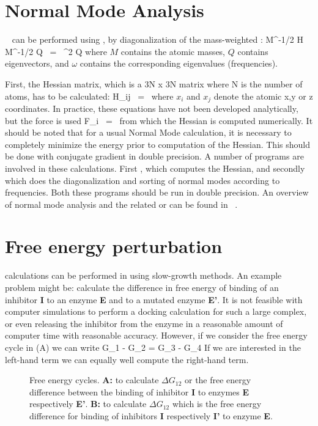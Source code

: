 \section{Normal Mode Analysis}
~\cite{Levitt83,Go83,BBrooks83b} 
can be performed using {\gromacs}, by diagonalization of the mass-weighted
:
\beq
M^{-1/2} H M^{-1/2} Q   ~=~     \omega^2 Q
\eeq
where $M$ contains the atomic masses, $Q$ contains eigenvectors, and $\omega$
contains the corresponding eigenvalues (frequencies).

First, the Hessian matrix, which is a 3N x 3N matrix where N is the number
of atoms, has to be calculated:
\beq
H_{ij}  ~=~     
\eeq
where $x_i$ and $x_j$ denote the atomic x,y or z coordinates.
In practice, these equations have not been developed analytically, but
the force is used
\beq
F_i     ~=~     
\eeq
from which the Hessian is computed numerically. It should be noted that
for a usual Normal Mode calculation, it is necessary to completely minimize 
the energy prior to computation of the Hessian. This should be done
with conjugate gradient in double precision.
A number of {\gromacs} programs are involved in these
calculations. First , which computes the Hessian,
and secondly  which does the diagonalization and
sorting of normal modes according to frequencies. Both these programs
should be run in double precision. An overview of normal mode analysis
and the related  or
 can be found in ~\cite{Hayward95b}.

\section{Free energy perturbation}
\label{sec:fepalg}
 calculations can be performed
in {\gromacs} using slow-growth methods. An example problem might be:
calculate the difference in free energy of binding of an inhibitor {\bf I}
to an enzyme {\bf E} and to a mutated enzyme {\bf E'}.
It is not feasible with computer simulations to perform a docking
calculation for such a large complex, or even releasing the inhibitor from
the enzyme in a reasonable amount of computer time with reasonable accuracy.
However, if we consider the free energy cycle in (A)
we can write
\beq
\Delta G_1 - \Delta G_2 =       \Delta G_3 - \Delta G_4
\label{eqn:ddg}
\eeq
If we are interested in the left-hand term we can equally well compute
the right-hand term.
\begin{figure}
\centerline{\hspace{2cm}}
\caption[Free energy cycles.]{Free energy cycles. {\bf A:} to
calculate $\Delta G_{12}$ or the free energy difference between the
binding of inhibitor {\bf I} to enzymes {\bf E} respectively {\bf
E'}. {\bf B:} to calculate $\Delta G_{12}$ which is the free energy
difference for binding of inhibitors {\bf I} respectively {\bf I'} to
enzyme {\bf E}.}
\label{fig:free}
\end{figure}

